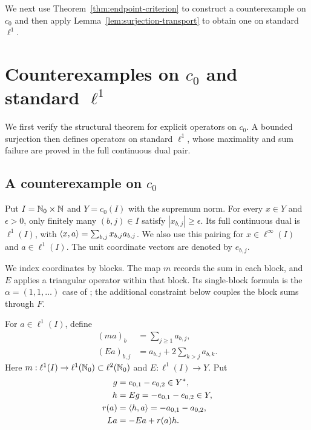 We next use Theorem~\ref{thm:endpoint-criterion} to construct a
counterexample on $c_0$ and then apply Lemma~\ref{lem:surjection-transport}
to obtain one on standard $\ell^1$.

\section{Counterexamples on $c_0$ and standard $\ell^1$}
\label{sec:counterexamples}
We first verify the structural theorem for explicit operators on $c_0$.
A bounded surjection then defines operators on standard $\ell^1$, whose
maximality and sum failure are proved in the full continuous dual pair.

\subsection{A counterexample on $c_0$}

Put $I=\mathbb N_0\times\mathbb N$ and $Y=c_0(I)$ with the supremum norm.
For every $x\in Y$ and $\epsilon>0$, only finitely many $(b,j)\in I$
satisfy $|x_{b,j}|\ge\epsilon$. Its full continuous dual is $\ell^1(I)$,
with $\langle x,a\rangle=\sum_{b,j}x_{b,j}a_{b,j}$. We also use this pairing
for $x\in\ell^\infty(I)$ and $a\in\ell^1(I)$.
The unit coordinate vectors are denoted by $e_{b,j}$.

We index coordinates by blocks. The map $m$ records the sum in each block,
and $E$ applies a triangular operator within that block. Its single-block
formula is the $\alpha=(1,1,\ldots)$ case of
\cite[author version, Example~4.1]{bauschkeetal2011}; the additional constraint below
couples the block sums through $F$.
\begin{definition}
For $a\in\ell^1(I)$, define
\begin{equation}
\begin{aligned}
(ma)_b&=\sum_{j\ge1}a_{b,j},\\
(Ea)_{b,j}&=a_{b,j}+2\sum_{k>j}a_{b,k}.
\end{aligned}
\label{eq:D4}
\end{equation}
Here $m:\ell^1(I)\to\ell^1(\mathbb N_0)\subset\ell^2(\mathbb N_0)$ and
$E:\ell^1(I)\to Y$. Put
\begin{equation}
\begin{aligned}
g&=e_{0,1}-e_{0,2}\in Y^*,\\
h&=Eg=-e_{0,1}-e_{0,2}\in Y,\\
r(a)&=\langle h,a\rangle=-a_{0,1}-a_{0,2},\\
La&=-Ea+r(a)h.
\end{aligned}
\label{eq:D5}
\end{equation}
\end{definition}

